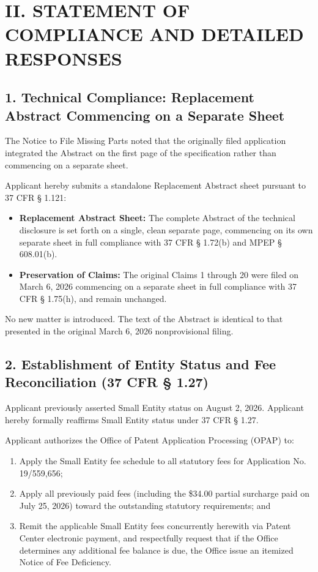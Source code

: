 \documentclass[11pt,letterpaper]{article}
\begin{document}
\section*{II. STATEMENT OF COMPLIANCE AND DETAILED RESPONSES}

\subsection*{1. Technical Compliance: Replacement Abstract Commencing on a Separate Sheet}

The Notice to File Missing Parts noted that the originally filed application integrated the Abstract on the first page of the specification rather than commencing on a separate sheet.

Applicant hereby submits a standalone Replacement Abstract sheet pursuant to 37 CFR \S{} 1.121:
\begin{itemize}[leftmargin=2em, itemsep=2pt, parsep=0pt]
    \item \textbf{Replacement Abstract Sheet:} The complete Abstract of the technical disclosure is set forth on a single, clean separate page, commencing on its own separate sheet in full compliance with 37 CFR \S{} 1.72(b) and MPEP \S{} 608.01(b).
    \item \textbf{Preservation of Claims:} The original Claims 1 through 20 were filed on March 6, 2026 commencing on a separate sheet in full compliance with 37 CFR \S{} 1.75(h), and remain unchanged.
\end{itemize}

No new matter is introduced. The text of the Abstract is identical to that presented in the original March 6, 2026 nonprovisional filing.

\subsection*{2. Establishment of Entity Status and Fee Reconciliation (37 CFR \S{} 1.27)}

Applicant previously asserted Small Entity status on August 2, 2026. Applicant hereby formally reaffirms Small Entity status under 37 CFR \S{} 1.27. 

Applicant authorizes the Office of Patent Application Processing (OPAP) to:
\begin{enumerate}[label=(\alph*), leftmargin=2em, itemsep=2pt, parsep=0pt]
    \item Apply the Small Entity fee schedule to all statutory fees for Application No. 19/559,656;
    \item Apply all previously paid fees (including the \$34.00 partial surcharge paid on July 25, 2026) toward the outstanding statutory requirements; and
    \item Remit the applicable Small Entity fees concurrently herewith via Patent Center electronic payment, and respectfully request that if the Office determines any additional fee balance is due, the Office issue an itemized Notice of Fee Deficiency.
\end{enumerate}
\end{document}
